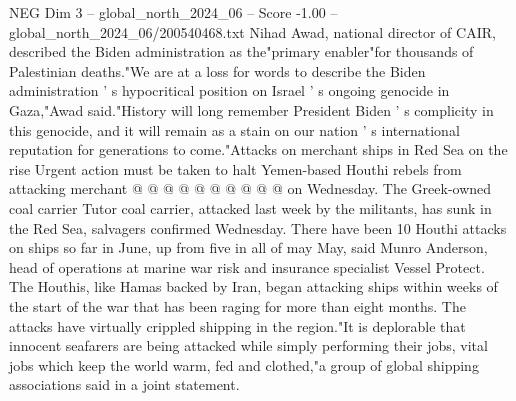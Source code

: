 \begin{textsample}{NEG Dim 3 – global\_north\_2024\_06 – Score -1.00 – global\_north\_2024\_06/200540468.txt}
Nihad Awad, national director of CAIR, described the Biden administration as the"primary enabler"for thousands of Palestinian deaths."We are at a loss for words to describe the Biden administration ' s hypocritical position on Israel ' s ongoing genocide in Gaza,"Awad said."History will long remember President Biden ' s complicity in this genocide, and it will remain as a stain on our nation ' s international reputation for generations to come."Attacks on merchant ships in Red Sea on the rise Urgent action must be taken to halt Yemen-based Houthi rebels from attacking merchant @ @ @ @ @ @ @ @ @ @ on Wednesday.
The Greek-owned coal carrier Tutor coal carrier, attacked last week by the militants, has sunk in the Red Sea, salvagers confirmed Wednesday.
There have been 10 Houthi attacks on ships so far in June, up from five in all of may May, said Munro Anderson, head of operations at marine war risk and insurance specialist Vessel Protect.
The Houthis, like Hamas backed by Iran, began attacking ships within weeks of the start of the war that has been raging for more than eight months.
The attacks have virtually crippled shipping in the region."It is deplorable that innocent seafarers are being attacked while simply performing their jobs, vital jobs which keep the world warm, fed and clothed,"a group of global shipping associations said in a joint statement.

\end{textsample}
